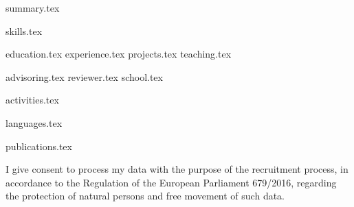 \documentclass[letterpaper,11pt]{article}
\begin{document}

\vspace{1.2em}
%
\begin{minipage}[t]{0.67\textwidth}
{summary.tex}
\end{minipage}\hfill
\begin{minipage}[t]{0.28\textwidth}
{skills.tex}
\end{minipage}

{education.tex}
{experience.tex}
{projects.tex}
{teaching.tex}

{advisoring.tex}
{reviewer.tex}
{school.tex}

\begin{minipage}[t]{0.65\textwidth}
{activities.tex}
\end{minipage}\hfill
\begin{minipage}[t]{0.3\textwidth}
{languages.tex}
\end{minipage}

{publications.tex}

I give consent to process my data with the purpose of the recruitment process, in accordance to the Regulation of the European Parliament 679/2016, regarding the protection of natural persons and free movement of such data.
\end{document}
